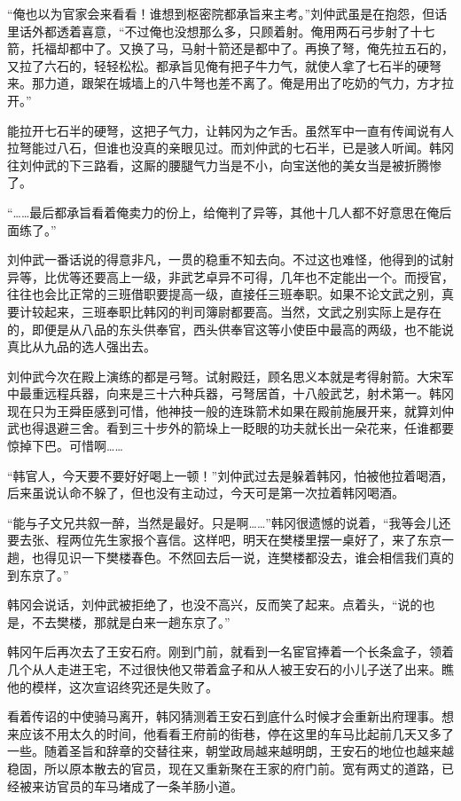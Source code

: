 “俺也以为官家会来看看！谁想到枢密院都承旨来主考。”刘仲武虽是在抱怨，但话里话外都透着喜意，“不过俺也没想那么多，只顾着射。俺用两石弓步射了十七箭，托福却都中了。又换了马，马射十箭还是都中了。再换了弩，俺先拉五石的，又拉了六石的，轻轻松松。都承旨见俺有把子牛力气，就使人拿了七石半的硬弩来。那力道，跟架在城墙上的八牛弩也差不离了。俺是用出了吃奶的气力，方才拉开。”

能拉开七石半的硬弩，这把子气力，让韩冈为之乍舌。虽然军中一直有传闻说有人拉弩能过八石，但谁也没真的亲眼见过。而刘仲武的七石半，已是骇人听闻。韩冈往刘仲武的下三路看，这厮的腰腿气力当是不小，向宝送他的美女当是被折腾惨了。

“……最后都承旨看着俺卖力的份上，给俺判了异等，其他十几人都不好意思在俺后面练了。”

刘仲武一番话说的得意非凡，一贯的稳重不知去向。不过这也难怪，他得到的试射异等，比优等还要高上一级，非武艺卓异不可得，几年也不定能出一个。而授官，往往也会比正常的三班借职要提高一级，直接任三班奉职。如果不论文武之别，真要计较起来，三班奉职比韩冈的判司簿尉都要高。当然，文武之别实际上是存在的，即便是从八品的东头供奉官，西头供奉官这等小使臣中最高的两级，也不能说真比从九品的选人强出去。

刘仲武今次在殿上演练的都是弓弩。试射殿廷，顾名思义本就是考得射箭。大宋军中最重远程兵器，向来是三十六种兵器，弓弩居首，十八般武艺，射术第一。韩冈现在只为王舜臣感到可惜，他神技一般的连珠箭术如果在殿前施展开来，就算刘仲武也得退避三舍。看到三十步外的箭垛上一眨眼的功夫就长出一朵花来，任谁都要惊掉下巴。可惜啊……

“韩官人，今天要不要好好喝上一顿！”刘仲武过去是躲着韩冈，怕被他拉着喝酒，后来虽说认命不躲了，但也没有主动过，今天可是第一次拉着韩冈喝酒。

“能与子文兄共叙一醉，当然是最好。只是啊……”韩冈很遗憾的说着，“我等会儿还要去张、程两位先生家报个喜信。这样吧，明天在樊楼里摆一桌好了，来了东京一趟，也得见识一下樊楼春色。不然回去后一说，连樊楼都没去，谁会相信我们真的到东京了。”

韩冈会说话，刘仲武被拒绝了，也没不高兴，反而笑了起来。点着头，“说的也是，不去樊楼，那就是白来一趟东京了。”

韩冈午后再次去了王安石府。刚到门前，就看到一名宦官捧着一个长条盒子，领着几个从人走进王宅，不过很快他又带着盒子和从人被王安石的小儿子送了出来。瞧他的模样，这次宣诏终究还是失败了。

看着传诏的中使骑马离开，韩冈猜测着王安石到底什么时候才会重新出府理事。想来应该不用太久的时间，他看看王府前的街巷，停在这里的车马比起前几天又多了一些。随着圣旨和辞章的交替往来，朝堂政局越来越明朗，王安石的地位也越来越稳固，所以原本散去的官员，现在又重新聚在王家的府门前。宽有两丈的道路，已经被来访官员的车马堵成了一条羊肠小道。

